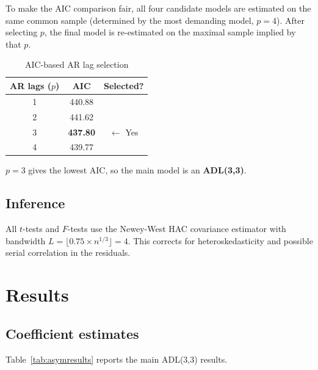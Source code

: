 \documentclass[12pt,a4paper]{article}
\begin{document}
To make the AIC comparison fair, all four candidate models are estimated on the same common sample (determined by the most demanding model, $p = 4$). After selecting $p$, the final model is re-estimated on the maximal sample implied by that $p$.

\begin{table}[H]
\centering
\caption{AIC-based AR lag selection}
\label{tab:aicselection}
\small
\begin{tabular}{ccc}
\toprule
\textbf{AR lags ($p$)} & \textbf{AIC} & \textbf{Selected?} \\
\midrule
1 & 440.88 & \\
2 & 441.62 & \\
3 & \textbf{437.80} & $\leftarrow$ Yes \\
4 & 439.77 & \\
\bottomrule
\end{tabular}
\end{table}

$p = 3$ gives the lowest AIC, so the main model is an \textbf{ADL(3,3)}.

\subsection{Inference}

All $t$-tests and $F$-tests use the Newey-West HAC covariance estimator with bandwidth $L = \lfloor 0.75 \times n^{1/3} \rfloor = 4$. This corrects for heteroskedasticity and possible serial correlation in the residuals.


\section{Results}

\subsection{Coefficient estimates}

Table~\ref{tab:asymresults} reports the main ADL(3,3) results.
\end{document}
